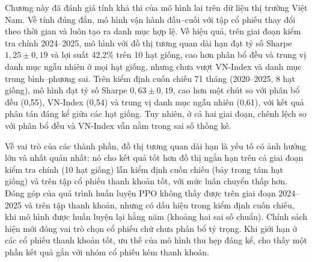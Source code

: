 Chương này đã đánh giá tính khả thi của mô hình lai trên dữ liệu thị trường Việt Nam. Về tính đúng đắn, mô hình vận hành đầu--cuối với tập cổ phiếu thay đổi theo thời gian và luôn tạo ra danh mục hợp lệ. Về hiệu quả, trên giai đoạn kiểm tra chính 2024--2025, mô hình với đồ thị tương quan dài hạn đạt tỷ số Sharpe $1{,}25\pm0{,}19$ và lợi suất 42,2\% trên 10 hạt giống, cao hơn phân bổ đều và trung vị danh mục ngẫu nhiên ở mọi hạt giống, nhưng chưa vượt VN-Index và danh mục trung bình--phương sai. Trên kiểm định cuốn chiếu 71 tháng (2020--2025, 8 hạt giống), mô hình đạt tỷ số Sharpe $0{,}63\pm0{,}19$, cao hơn một chút so với phân bổ đều (0,55), VN-Index (0,54) và trung vị danh mục ngẫu nhiên (0,61), với kết quả phân tán đáng kể giữa các hạt giống. Tuy nhiên, ở cả hai giai đoạn, chênh lệch so với phân bổ đều và VN-Index vẫn nằm trong sai số thống kê.

Về vai trò của các thành phần, đồ thị tương quan dài hạn là yếu tố có ảnh hưởng lớn và nhất quán nhất: nó cho kết quả tốt hơn đồ thị ngắn hạn trên cả giai đoạn kiểm tra chính (10 hạt giống) lẫn kiểm định cuốn chiếu (bảy trong tám hạt giống) và trên tập cổ phiếu thanh khoản tốt, với mức luân chuyển thấp hơn. Đóng góp của quá trình huấn luyện PPO không thấy được trên giai đoạn 2024--2025 và trên tập thanh khoản, nhưng có dấu hiệu trong kiểm định cuốn chiếu, khi mô hình được huấn luyện lại hằng năm (khoảng hai sai số chuẩn). Chính sách hiện mới đóng vai trò chọn cổ phiếu chứ chưa phân bổ tỷ trọng. Khi giới hạn ở các cổ phiếu thanh khoản tốt, ưu thế của mô hình thu hẹp đáng kể, cho thấy một phần kết quả gắn với nhóm cổ phiếu kém thanh khoản.

